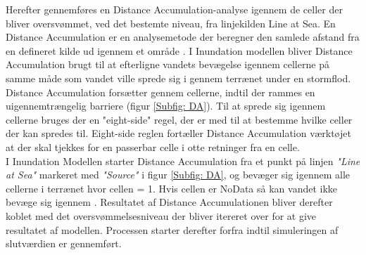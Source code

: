 Herefter gennemføres en Distance Accumulation-analyse igennem de celler der bliver oversvømmet, ved det bestemte niveau, fra linjekilden Line at Sea. En Distance Accumulation er en analysemetode der beregner den samlede afstand fra en defineret kilde ud igennem et område \citep{esri_how_nodate}. I Inundation modellen bliver Distance Accumulation brugt til at efterligne vandets bevægelse igennem cellerne på samme måde som vandet ville sprede sig i gennem terrænet under en stormflod. Distance Accumulation forsætter gennem cellerne, indtil der rammes en uigennemtrængelig barriere (figur \ref{Subfig: DA}). Til at sprede sig igennem cellerne bruges der en "eight-side" \hspace{0.2cm}regel, der er med til at bestemme hvilke celler der kan spredes til. Eight-side reglen fortæller Distance Accumulation værktøjet at der skal tjekkes for en passerbar celle i otte retninger fra en celle.\\

I Inundation Modellen starter Distance Accumulation fra et punkt på linjen \textit{"Line at Sea"} markeret med \textit{"Source"} i figur \ref{Subfig: DA}, og bevæger sig igennem alle cellerne i terrænet hvor cellen = 1. Hvis cellen er NoData så kan vandet ikke bevæge sig igennem \citep{balstrom_kirby_inundation}. Resultatet af Distance Accumulationen bliver derefter koblet med det oversvømmelsesniveau der bliver itereret over for at give resultatet af modellen. Processen starter derefter forfra indtil simuleringen af slutværdien er gennemført.  